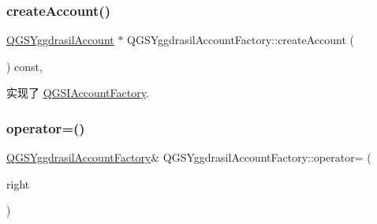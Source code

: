 \subsubsection{\texorpdfstring{create\+Account()}{createAccount()}}
{\footnotesize\ttfamily \mbox{\hyperlink{class_q_g_s_yggdrasil_account}{Q\+G\+S\+Yggdrasil\+Account}} $\ast$ Q\+G\+S\+Yggdrasil\+Account\+Factory\+::create\+Account (\begin{DoxyParamCaption}{ }\end{DoxyParamCaption}) const\hspace{0.3cm}{\ttfamily [override]}, {\ttfamily [virtual]}}



实现了 \mbox{\hyperlink{class_q_g_s_i_account_factory_adf21a37bf465543c022b2bee9e61c3fd}{Q\+G\+S\+I\+Account\+Factory}}.

\mbox{\label{class_q_g_s_yggdrasil_account_factory_a0600f44d1408b403b0726b41f40869d1}} 
\subsubsection{\texorpdfstring{operator=()}{operator=()}\hspace{0.1cm}{\footnotesize\ttfamily [1/2]}}
{\footnotesize\ttfamily \mbox{\hyperlink{class_q_g_s_yggdrasil_account_factory}{Q\+G\+S\+Yggdrasil\+Account\+Factory}}\& Q\+G\+S\+Yggdrasil\+Account\+Factory\+::operator= (\begin{DoxyParamCaption}\item[{const \mbox{\hyperlink{class_q_g_s_yggdrasil_account_factory}{Q\+G\+S\+Yggdrasil\+Account\+Factory}} \&}]{right }\end{DoxyParamCaption})\hspace{0.3cm}{\ttfamily [delete]}}

\mbox{\label{class_q_g_s_yggdrasil_account_factory_a768fa9c941363703449e77a5db99be4f}} 
